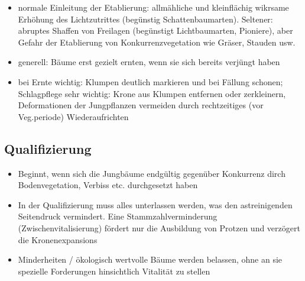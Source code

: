 \documentclass{article}
\begin{document}
\begin{itemize}
    \item normale Einleitung der Etablierung: allmähliche und kleinflächig wikrsame Erhöhung des Lichtzutrittes (begünstig Schattenbaumarten). Seltener: abruptes Shaffen von Freilagen (begünstigt Lichtbaumarten, Pioniere), aber Gefahr der Etablierung von Konkurrenzvegetation wie  Gräser, Stauden usw.
    
    \item generell: Bäume erst gezielt ernten, wenn sie sich bereits verjüngt haben
    
    \item bei Ernte wichtig: Klumpen deutlich markieren und bei Fällung schonen; Schlagpflege sehr wichtig: Krone aus Klumpen entfernen oder zerkleinern, Deformationen der Jungpflanzen vermeiden durch rechtzeitiges (vor Veg.periode) Wiederaufrichten
      
\end{itemize} 
  
  
  
\subsection{Qualifizierung}

\begin{itemize}

 \item Beginnt, wenn sich die Jungbäume endgültig gegenüber Konkurrenz dirch Bodenvegetation, Verbiss etc. durchgesetzt haben

 \item In der Qualifizierung muss alles unterlassen werden, was den astreinigenden Seitendruck vermindert. Eine Stammzahlverminderung (Zwischenvitalisierung) fördert nur die Ausbildung von Protzen und verzögert die Kronenexpansions

 \item Minderheiten / ökologisch wertvolle Bäume werden belassen, ohne an sie spezielle Forderungen hinsichtlich Vitalität zu stellen



































\end{itemize}













\end{document}
